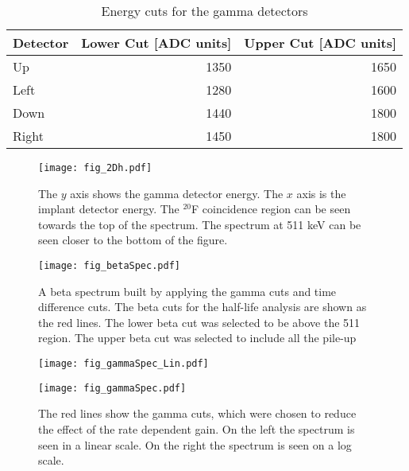 \documentclass[MaxHughesThesis.tex]{subfiles}
\begin{document}
\begin{table}[!htb]
	\centering
	\caption{Energy cuts for the gamma detectors}
	\begin{tabular}{lrr}
	Detector & Lower Cut [ADC units] & Upper Cut [ADC units] \\ \hline
	Up & 1350 & 1650 \\
	Left & 1280 & 1600\\
	Down & 1440 & 1800 \\
	Right & 1450 & 1800
	\end{tabular}
	\label{tab:GammaCuts}
\end{table}

\begin{figure}[!htb]
	\centerline{\texttt{[image: fig\_2Dh.pdf]}}
	\caption{The $y$ axis shows the gamma detector energy.
		   The $x$ axis is the implant detector energy.
		   The $^{20}$F coincidence region can be seen towards the top of the spectrum.
		   The spectrum at 511 keV can be seen closer to the bottom of the figure.
		   }
	\label{fig:2DGraph}
\end{figure}

\begin{figure}[!htb]
	\centerline{\texttt{[image: fig\_betaSpec.pdf]}}
	\caption{
		 A beta spectrum built by applying the gamma cuts and time difference cuts. 
		 The beta cuts for the half-life analysis are shown as the red lines.
		 The lower beta cut was selected to be above the 511 region.
		 The upper beta cut was selected to include all the pile-up}
	
	\label{fig:BetaGraph}
\end{figure}

\begin{figure}[!htb]
        \centering
        \begin{minipage}{0.50\textwidth}
            \centerline{\texttt{[image: fig\_gammaSpec\_Lin.pdf]}}
        \end{minipage}\hfill
        \begin{minipage}{0.50\textwidth}
            \centerline{\texttt{[image: fig\_gammaSpec.pdf]}}
        \end{minipage}
	\caption{The red lines show the gamma cuts, which were chosen to reduce the effect of the rate dependent gain. 
		 On the left the spectrum is seen in a linear scale.
		 On the right the spectrum is seen on a log scale.}
	\label{fig:GammaGraph}
\end{figure}
\end{document}
